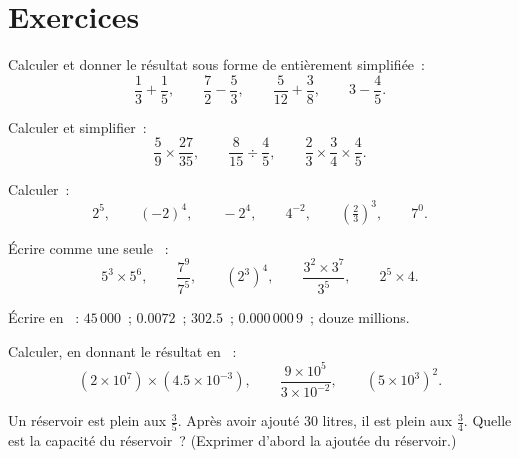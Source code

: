 \section{Exercices}

\begin{exercise}[$\star$]\label{exo:g9:fractions:1}
Calculer et donner le résultat sous forme de  entièrement
simplifiée~:
\[
\frac13 + \frac15, \qquad
\frac72 - \frac53, \qquad
\frac{5}{12} + \frac38, \qquad
3 - \frac45 .
\]
\end{exercise}

\begin{exercise}[$\star$]\label{exo:g9:fractions:2}
Calculer et simplifier~:
\[
\frac59 \times \frac{27}{35}, \qquad
\frac{8}{15} \div \frac{4}{5}, \qquad
\frac23 \times \frac34 \times \frac45 .
\]
\end{exercise}

\begin{exercise}[$\star$]\label{exo:g9:fractions:3}
Calculer~:
\[
2^5, \qquad (-2)^4, \qquad -2^4, \qquad 4^{-2}, \qquad
\left(\tfrac23\right)^3, \qquad 7^0 .
\]
\end{exercise}

\begin{exercise}[$\star$]\label{exo:g9:fractions:4}
Écrire comme une seule ~:
\[
5^3 \times 5^6, \qquad
\frac{7^9}{7^5}, \qquad
\left(2^3\right)^4, \qquad
\frac{3^2 \times 3^7}{3^5}, \qquad
2^5 \times 4 .
\]
\end{exercise}

\begin{exercise}[$\star$]\label{exo:g9:fractions:5}
Écrire en ~: $45\,000$~; $0.0072$~; $302.5$~;
$0.000\,000\,9$~; douze millions.
\end{exercise}

\begin{exercise}[$\star\star$]\label{exo:g9:fractions:6}
Calculer, en donnant le résultat en ~:
\[
(2 \times 10^7) \times (4.5 \times 10^{-3}),
\qquad
\frac{9 \times 10^5}{3 \times 10^{-2}},
\qquad
(5 \times 10^3)^2 .
\]
\end{exercise}

\begin{exercise}[$\star\star$]\label{exo:g9:fractions:7}
Un réservoir est plein aux $\frac35$. Après avoir ajouté $30$ litres,
il est plein aux $\frac34$. Quelle est la capacité du réservoir~?
(Exprimer d'abord la  ajoutée du réservoir.)
\end{exercise}

